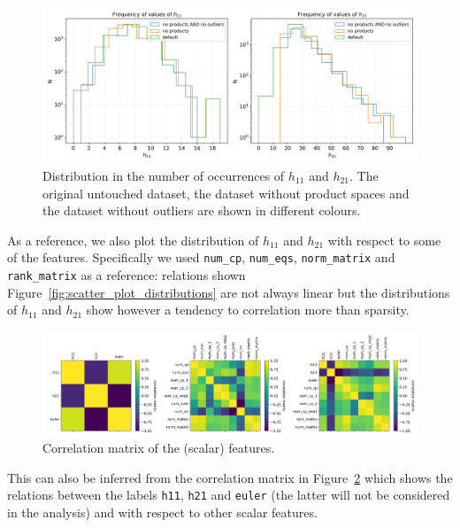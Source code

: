     \begin{figure}[!t]
        \centering
        \includegraphics[width=\textwidth]{tex/img/h11_h21_occurrencies.png}
        \caption{Distribution in the number of occurrences of $h_{11}$ and $h_{21}$. The original untouched dataset, the dataset without product spaces and the dataset without outliers are shown in different colours.}
        \label{fig:distribution_occurrences}
    \end{figure}
    
    As a reference, we also plot the distribution of $h_{11}$ and $h_{21}$ with respect to some of the features. Specifically we used \texttt{num\_cp}, \texttt{num\_eqs}, \texttt{norm\_matrix} and \texttt{rank\_matrix} as a reference: relations shown Figure~\ref{fig:scatter_plot_distributions} are not always linear but the distributions of $h_{11}$ and $h_{21}$ show however a tendency to correlation more than sparsity.
    
    \begin{figure}[!t]
        \centering
        \includegraphics[width=\textwidth]{tex/img/correlation_matrix.png}
        \caption{Correlation matrix of the (scalar) features.}
        \label{fig:correlation_matrix}
    \end{figure}
    
    This can also be inferred from the correlation matrix in Figure~\ref{fig:correlation_matrix} which shows the relations between the labels \texttt{h11}, \texttt{h21} and \texttt{euler} (the latter will not be considered in the analysis) and with respect to other scalar features.
    
